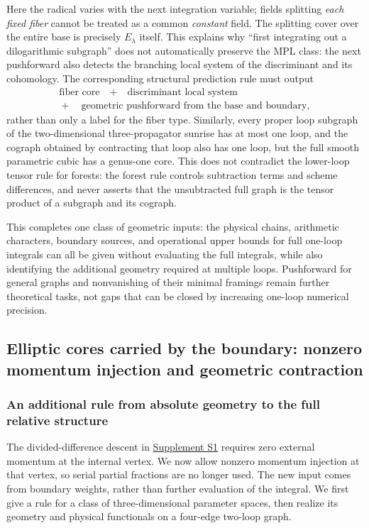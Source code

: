 \documentclass[11pt,a4paper,oneside]{article}
\theoremstyle{plain}
\theoremstyle{definition}
\theoremstyle{remark}
\numberwithin{equation}{section}
\newcommand{\otherref}[2]{\href{#1.pdf}{#2}}
\begin{document}
Here the radical varies with the next integration variable; fields splitting \emph{each fixed fiber}
cannot be treated as a common \emph{constant} field.
The splitting cover over the entire base is precisely $E_\lambda$ itself.
This explains why ``first integrating out a dilogarithmic subgraph'' does not automatically preserve the MPL class:
the next pushforward also detects the branching local system of the discriminant and its cohomology.
The corresponding structural prediction rule must output
\[
\begin{gathered}
 \text{fiber core}\quad+\quad\text{discriminant local system}\\
       {}+\quad\text{geometric pushforward from the base and boundary},
\end{gathered}
\]
rather than only a label for the fiber type.
Similarly, every proper loop subgraph of the two-dimensional three-propagator sunrise has at most one loop, and the cograph obtained by contracting that loop also has one loop,
but the full smooth parametric cubic has a genus-one core.
This does not contradict the lower-loop tensor rule for forests: the forest rule controls subtraction terms and scheme differences,
and never asserts that the unsubtracted full graph is the tensor product of a subgraph and its cograph.

This completes one class of geometric inputs: the physical chains, arithmetic characters, boundary sources, and operational upper bounds
for full one-loop integrals can all be given without evaluating the full integrals, while also identifying the additional geometry required at multiple loops.
Pushforward for general graphs and nonvanishing of their minimal framings remain further theoretical tasks,
not gaps that can be closed by increasing one-loop numerical precision.



\subsection{Elliptic cores carried by the boundary: nonzero momentum injection and geometric contraction}
\label{unified:sec:boundaryelliptic}
\subsubsection{An additional rule from absolute geometry to the full relative structure}
The divided-difference descent in \otherref{feynman_periods_supplement_en}{Supplement S1} requires zero external momentum at the internal vertex. We now allow nonzero momentum injection at that vertex,
so serial partial fractions are no longer used. The new input comes from boundary weights, rather than further evaluation of the integral.
We first give a rule for a class of three-dimensional parameter spaces, then realize its geometry and physical functionals on a four-edge two-loop graph.
\end{document}
